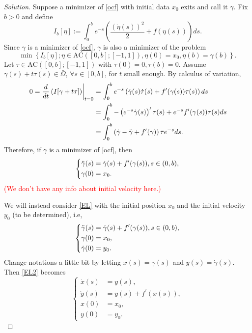 \documentclass[english,reqno]{amsart}
\newenvironment{solution}
  {\renewcommand\qedsymbol{$\blacksquare$}\begin{proof}[Solution]}
  {\end{proof}}
\begin{document}
\begin{enumerate}[label=\arabic*)]
\begin{solution}
    
Suppose a minimizer of \eqref{ocf} with initial data $x_0$ exits and call it $\gamma$. Fix $b >0$ and define $$\displaystyle I_b[\eta] := \int_0^b e^{-s} \left( \frac{\left( \dot{\eta}(s) \right)^2}{2} + f(\eta (s)) \right)ds.$$
Since $\gamma$ is a minimizer of \eqref{ocf}, $\gamma$ is also a minimizer of the problem
\begin{equation}
    \min \left\{ I_b [\eta] ; \eta \in \mathrm{AC}\left([0, b]; [-1,1]\right) , \eta(0) = x_0, \eta(b) =\gamma(b) \right\}.
\end{equation}
Let $\tau \in \mathrm{AC}\left([0, b]; [-1,1]\right)$ with $ \tau(0) = 0, \tau(b) =0$. Assume $\gamma(s) +t \tau(s) \in \bar{\Omega}$, $ \forall s \in [0,b]$, for $t$ small enough. By calculus of variation, 
\begin{equation*}
\begin{aligned}
    \left.  0=\frac{d}{dt}\left( I[\gamma +t \tau]\right) \right|_{t=0} &=\int_0^b e^{-s} \left(\dot{\gamma}(s)  \dot{\tau}(s) + f^\prime(\gamma(s)) \tau(s) \right)ds\\
    &=\int_0^b -\left( e^{-s} \dot{\gamma}(s) \right)^\prime \tau(s) + e^{-s} f^\prime(\gamma(s)) \tau(s)ds\\
    &=\int_0^b \left( \dot{\gamma} -\Ddot{\gamma} +f^\prime (\gamma)\right)\tau e^{-s}ds.
\end{aligned}
\end{equation*}
Therefore, if $\gamma$ is a minimizer of \eqref{ocf}, then 
\begin{equation}
\label{EL}
\left\{
\begin{aligned}
     \Ddot{\gamma}(s)&=\dot{\gamma}(s) + f^\prime (\gamma(s)), s\in (0,b),\\
     \gamma(0)&=x_0.
\end{aligned}
\right.
\end{equation}
\textcolor{red}{(We don't have any info about initial velocity here.)}

We will instead consider \eqref{EL} with the initial position $x_0$ and the initial velocity $y_0$ (to be determined), i.e,
\begin{equation}
\label{EL2}
\left\{
\begin{aligned}
     \Ddot{\gamma}(s)&=\dot{\gamma}(s) + f^\prime (\gamma(s)), s\in (0,b),\\
     \gamma(0)&=x_0,\\
     \dot{\gamma}(0)&=y_0.
\end{aligned}
\right.
\end{equation}
Change notations a little bit by letting $x(s)= \gamma(s)$ and $y(s)=\dot{\gamma}(s)$. Then \eqref{EL2} becomes
\begin{equation}
\label{ode}
\left\{
\begin{aligned}
\dot{x}(s)&=y(s),\\
     \dot{y}(s)&=y(s) + f^\prime (x(s)),\\
     x(0)&=x_0,\\
     y(0)&=y_0.
\end{aligned}
\right.
\end{equation}


\end{solution}
\end{enumerate}
\end{document}
